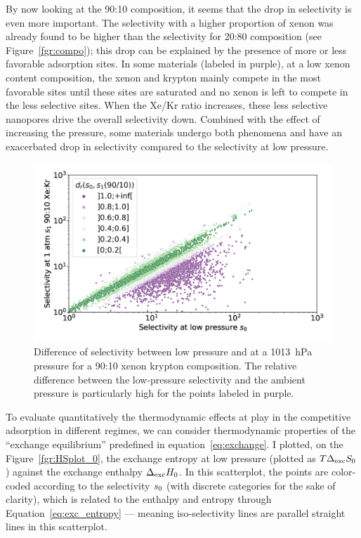 \documentclass[main.tex]{subfiles}
\begin{document}
By now looking at the 90:10 composition, it seems that the drop in selectivity is even more important. The selectivity with a higher proportion of xenon was already found to be higher than the selectivity for 20:80 composition (see Figure~\ref{fgr:compo}); this drop can be explained by the presence of more or less favorable adsorption sites. In some materials (labeled in purple), at a low xenon content composition, the xenon and krypton mainly compete in the most favorable sites until these sites are saturated and no xenon is left to compete in the less selective sites. When the Xe/Kr ratio increases, these less selective nanopores drive the overall selectivity down. Combined with the effect of increasing the pressure, some materials undergo both phenomena and have an exacerbated drop in selectivity compared to the selectivity at low pressure. 

\begin{figure}[t]
  \centering
    \includegraphics[width=0.6\linewidth]{figures/2-thermo/s_0_vs_s_9010_overview_log.jpg}
    \caption{Difference of selectivity between low pressure and at a \SI{1013}{\hecto\pascal} pressure for a 90:10 xenon krypton composition. The relative difference between the low-pressure selectivity and the ambient pressure is particularly high for the points labeled in purple.}\label{fgr:overview_9010}
\end{figure}
  
To evaluate quantitatively the thermodynamic effects at play in the competitive adsorption in different regimes, we can consider thermodynamic properties of the ``exchange equilibrium'' predefined in equation~\ref{eq:exchange}. I plotted, on the Figure~\ref{fgr:HSplot_0}, the exchange entropy at low pressure (plotted as $T\Delta_{\text{exc}}S_{\text{0}}$) against the exchange enthalpy $\Delta_{\text{exc}}H_{\text{0}}$. In this scatterplot, the points are color-coded according to the selectivity $s_{\text{0}}$ (with discrete categories for the sake of clarity), which is related to the enthalpy and entropy through Equation~\ref{eq:exc_entropy} --- meaning iso-selectivity lines are parallel straight lines in this scatterplot.
  
\end{document}
